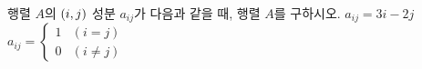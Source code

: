 행렬 $A$의 $(i{,}\mkern3mu\mathopen{}j)$ 성분 $a_{ij}$가 다음과 같을 때, 행렬 $A$를 구하시오. 
 $a_{ij}=3i-2j$
 $a_{ij}=\begin{cases} 1 & (i=j) \\ 0 & (i\ne j) \end{cases}$
